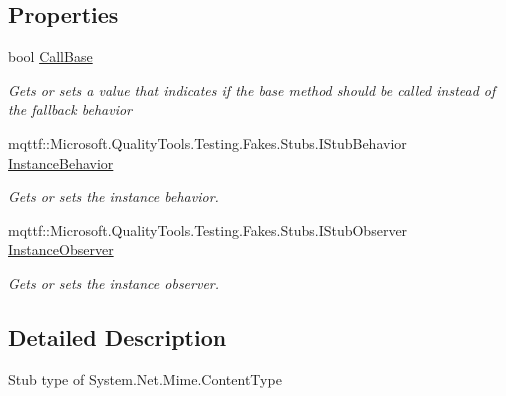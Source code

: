 \subsection*{Properties}
\begin{DoxyCompactItemize}
\item 
bool \hyperlink{class_system_1_1_net_1_1_mime_1_1_fakes_1_1_stub_content_type_ab66255ef61fc85df91ff4b904c3d7456}{Call\-Base}
\begin{DoxyCompactList}\small\item\em Gets or sets a value that indicates if the base method should be called instead of the fallback behavior\end{DoxyCompactList}\item 
mqttf\-::\-Microsoft.\-Quality\-Tools.\-Testing.\-Fakes.\-Stubs.\-I\-Stub\-Behavior \hyperlink{class_system_1_1_net_1_1_mime_1_1_fakes_1_1_stub_content_type_acb244f0b962f9a2a82bb7322ecf3b108}{Instance\-Behavior}
\begin{DoxyCompactList}\small\item\em Gets or sets the instance behavior.\end{DoxyCompactList}\item 
mqttf\-::\-Microsoft.\-Quality\-Tools.\-Testing.\-Fakes.\-Stubs.\-I\-Stub\-Observer \hyperlink{class_system_1_1_net_1_1_mime_1_1_fakes_1_1_stub_content_type_a1f88d9b44cefa23e97afd17f799793c1}{Instance\-Observer}
\begin{DoxyCompactList}\small\item\em Gets or sets the instance observer.\end{DoxyCompactList}\end{DoxyCompactItemize}


\subsection{Detailed Description}
Stub type of System.\-Net.\-Mime.\-Content\-Type



